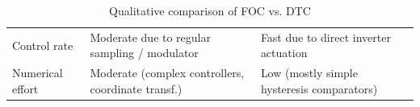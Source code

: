 \begin{frame}
\begin{table}
\begin{tabular}{@{}p{3.75cm} P{5cm} P{5cm}}
            Control rate                                                                                                                                                                                                                                            & Moderate due to regular sampling / modulator                             & Fast due to direct  inverter actuation                                 \\%
            Numerical effort                                                                                                                                                                                                                                        & Moderate (complex controllers, coordinate transf.)                       & Low (mostly simple hysteresis comparators)                             \\%
            \bottomrule%
        \end{tabular}
        \caption{Qualitative comparison of FOC vs. DTC}
        \label{tab:DTC_FOC_comparison}
    \end{table}
\end{frame}


